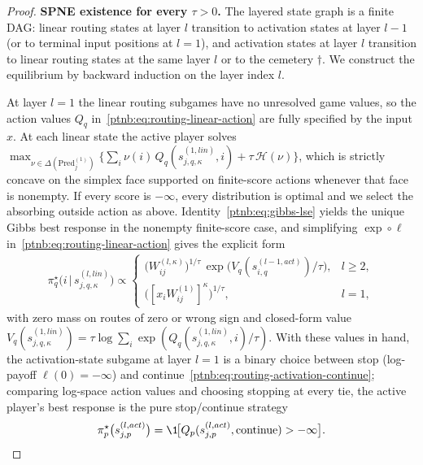 \begin{proof}
\textbf{SPNE existence for every $\tau > 0$.} The layered state graph is a finite DAG: linear
routing states at layer $l$ transition to activation states at layer $l-1$ (or to terminal input
positions at $l=1$), and activation states at layer $l$ transition to linear routing states at the
same layer $l$ or to the cemetery $\dagger$. We construct the equilibrium by backward induction on
the layer index $l$.

At layer $l=1$ the linear routing subgames have no unresolved game values, so the action values
$Q_q$ in~\eqref{ptnb:eq:routing-linear-action} are fully specified by the input $x$. At each linear
state the active player solves $\max_{\nu \in \Delta(\mathrm{Pred}_j^{(1)})} \{ \sum_i \nu(i)\,
    Q_q(s_{j,q,\kappa}^{(1, lin)}, i) + \tau\, \mathcal{H}(\nu) \}$, which is strictly concave on the simplex face supported on finite-score actions whenever that face is nonempty. If every score is $-\infty$, every distribution is optimal and we select the absorbing outside action as above. Identity~\eqref{ptnb:eq:gibbs-lse} yields the unique Gibbs best response in the nonempty finite-score case, and simplifying $\exp
    \circ \ell$ in~\eqref{ptnb:eq:routing-linear-action} gives the explicit form
\begin{align}\label{ptnb:eq:routing-spne-linear}
    \pi_q^\star\!\bigl(i \,\big|\, s_{j,q,\kappa}^{(l, lin)}\bigr)
    \propto
    \begin{cases}
        \bigl(W_{ij}^{(l,\kappa)}\bigr)^{1/\tau}\, \exp\!\bigl( V_q(s_{i,q}^{(l-1, act)})/\tau \bigr), & l
        \ge 2, \\[0.25em]
        \bigl([x_i W_{ij}^{(1)}]^\kappa\bigr)^{1/\tau}, & l = 1,
    \end{cases}
\end{align}
with zero mass on routes of zero or wrong sign and closed-form value $V_q(s_{j,q,\kappa}^{(1,lin)})
    = \tau \log \sum_i \exp(Q_q(s_{j,q,\kappa}^{(1,lin)},i)/\tau)$. With these values in hand, the
activation-state subgame at layer $l=1$ is a binary choice between stop (log-payoff $\ell(0) =
    -\infty$) and continue~\eqref{ptnb:eq:routing-activation-continue}; comparing log-space action values and choosing stopping at every tie, the active player's best response is the pure stop/continue strategy
\begin{align}\label{ptnb:eq:routing-spne-stop}
    \pi_p^\star\bigl(s_{j,p}^{(l, act)}\bigr)
    = \1\!\bigl[ Q_p(s_{j,p}^{(l, act)}, \mathrm{continue}) > -\infty \bigr].
\end{align}


\end{proof}
